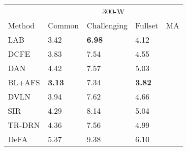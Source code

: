 \documentclass[twocolumn]{article}
\begin{document}
\begin{table}[]
\small
\begin{tabular}{@{}llllll@{}}
\toprule
\multicolumn{2}{l}{}                         & \multicolumn{4}{c}{300-W}                                                                                                                                            \\ \cmidrule(l){3-6} 
\multicolumn{2}{l}{\multirow{-2}{*}{Method}} & Common                               & Challenging                          & Fullset                              & MA                                              \\ \midrule
\multicolumn{2}{l}{LAB \cite{wu2018look}}                      & 3.42                                 & {\textbf{6.98}}                                 & 4.12                                 & \cellcolor[HTML]{FE0000}                        \\
\multicolumn{2}{l}{DCFE \cite{valle2018deeply}}                     & 3.83                                 & 7.54                                 & 4.55                                 & \cellcolor[HTML]{FE0000}                        \\
\multicolumn{2}{l}{DAN \cite{kowalski2017deep}}                      & 4.42                                 & 7.57                                 & 5.03                                 & \cellcolor[HTML]{FE0000}                        \\
\multicolumn{2}{l}{BL+AFS \cite{wang2020attention}}                   & {\textbf{3.13}} & 7.34 & {\textbf{3.82}} & \cellcolor[HTML]{FE0000}                        \\
\multicolumn{2}{l}{DVLN \cite{wu2017leveraging}}                     & 3.94                                 & 7.62                                 & 4.66                                 & \cellcolor[HTML]{FE0000}                        \\
\multicolumn{2}{l}{SIR \cite{hu2018facial}}                      & 4.29                                 & 8.14                                 & 5.04                                 & \cellcolor[HTML]{FE0000}                        \\
\multicolumn{2}{l}{TR-DRN \cite{lv2017deep}}                   & 4.36                                 & 7.56                                 & 4.99                                 & \cellcolor[HTML]{FE0000}                        \\
\multicolumn{2}{l}{DeFA \cite{liu2017dense}}                     & 5.37                                 & 9.38                                 & 6.10                                 & \cellcolor[HTML]{FE0000}                        \\ \midrule

\end{tabular}
\end{table}
\end{document}
